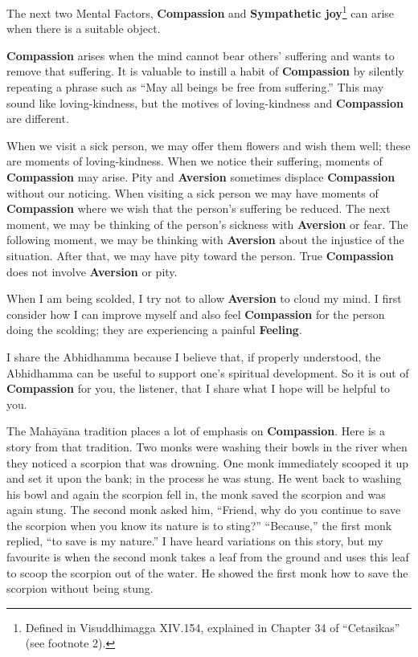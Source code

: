 The next two Mental Factors, \textbf{Compassion} and \textbf{Sympathetic joy}\footnote{Defined in Visuddhimagga XIV.154, explained in Chapter 34 of “Cetasikas” (see footnote 2).} can arise when there is a suitable object.

\textbf{Compassion} arises when the mind cannot bear others’ suffering and wants to remove that suffering. It is valuable to instill a habit of \textbf{Compassion} by silently repeating a phrase such as “May all beings be free from suffering.” This may sound like loving-kindness, but the motives of loving-kindness and \textbf{Compassion} are different.

When we visit a sick person, we may offer them flowers and wish them well; these are moments of loving-kindness. When we notice their suffering, moments of \textbf{Compassion} may arise. Pity and \textbf{Aversion} sometimes displace \textbf{Compassion} without our noticing. When visiting a sick person we may have moments of \textbf{Compassion} where we wish that the person’s suffering be reduced. The next moment, we may be thinking of the person’s sickness with \textbf{Aversion} or fear. The following moment, we may be thinking with \textbf{Aversion} about the injustice of the situation. After that, we may have pity toward the person. True \textbf{Compassion} does not involve \textbf{Aversion} or pity.

When I am being scolded, I try not to allow \textbf{Aversion} to cloud my mind. I first consider how I can improve myself and also feel \textbf{Compassion} for the person doing the scolding; they are experiencing a painful \textbf{Feeling}.

I share the Abhidhamma because I believe that, if properly understood, the Abhidhamma can be useful to support one’s spiritual development. So it is out of \textbf{Compassion} for you, the listener, that I share what I hope will be helpful to you.

The Mahāyāna tradition places a lot of emphasis on \textbf{Compassion}. Here is a story from that tradition. Two monks were washing their bowls in the river when they noticed a scorpion that was drowning. One monk immediately scooped it up and set it upon the bank; in the process he was stung. He went back to washing his bowl and again the scorpion fell in, the monk saved the scorpion and was again stung. The second monk asked him, “Friend, why do you continue to save the scorpion when you know its nature is to sting?” “Because,” the first monk replied, “to save is my nature.” I have heard variations on this story, but my favourite is when the second monk takes a leaf from the ground and uses this leaf to scoop the scorpion out of the water. He showed the first monk how to save the scorpion without being stung.

